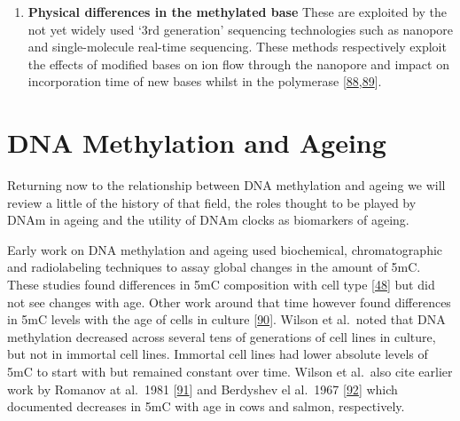 \documentclass[
]{book}
\providecommand{\tightlist}{%
  \setlength{\itemsep}{0pt}\setlength{\parskip}{0pt}}
\begin{document}
\begin{enumerate}
\def\labelenumi{\arabic{enumi}.}
\setcounter{enumi}{3}
\tightlist
\item
  \textbf{Physical differences in the methylated base}
  These are exploited by the not yet widely used `3rd generation' sequencing technologies such as nanopore and single-molecule real-time sequencing.
  These methods respectively exploit the effects of modified bases on ion flow through the nanopore and impact on incorporation time of new bases whilst in the polymerase {[}\protect\hyperlink{ref-Rhoads2015}{88},\protect\hyperlink{ref-Simpson2017}{89}{]}.
\end{enumerate}

\hypertarget{dna-methylation-and-ageing}{%
\section{DNA Methylation and Ageing}\label{dna-methylation-and-ageing}}

Returning now to the relationship between DNA methylation and ageing we will review a little of the history of that field, the roles thought to be played by DNAm in ageing and the utility of DNAm clocks as biomarkers of ageing.

Early work on DNA methylation and ageing used biochemical, chromatographic and radiolabeling techniques to assay global changes in the amount of 5mC.
These studies found differences in 5mC composition with cell type {[}\protect\hyperlink{ref-Ehrlich1982}{48}{]} but did not see changes with age.
Other work around that time however found differences in 5mC levels with the age of cells in culture {[}\protect\hyperlink{ref-Wilson1983}{90}{]}.
Wilson et al.~noted that DNA methylation decreased across several tens of generations of cell lines in culture, but not in immortal cell lines.
Immortal cell lines had lower absolute levels of 5mC to start with but remained constant over time.
Wilson et al.~also cite earlier work by Romanov at al.~1981 {[}\protect\hyperlink{ref-Romanov1981}{91}{]} and Berdyshev el al.~1967 {[}\protect\hyperlink{ref-Berdyshev1967}{92}{]} which documented decreases in 5mC with age in cows and salmon, respectively.
\end{document}
